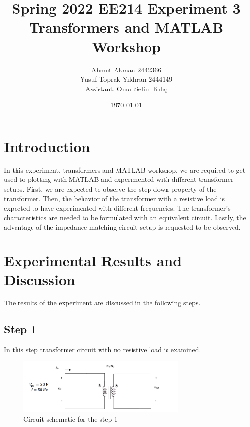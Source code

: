 \documentclass[letterpaper,12pt]{article}
\begin{document}
\thispagestyle{empty}

\title{Spring 2022 EE214 Experiment 3  \protect\\ Transformers and MATLAB Workshop }
\author{Ahmet Akman 2442366 \protect\\ Yusuf Toprak Yıldıran 2444149 \protect\\ Assistant: Onur Selim Kılıç}
\date{\today}
\maketitle
\tableofcontents
\section{Introduction}
In this experiment, transformers and MATLAB workshop, we are required to get used to plotting with MATLAB and experimented with different transformer setups. First, we are expected to observe the step-down property of the transformer. Then, the behavior of the transformer with a resistive load is expected to have experimented with different frequencies. The transformer's characteristics are needed to be formulated with an equivalent circuit. Lastly, the advantage of the impedance matching circuit setup is requested to be observed.
\section{Experimental Results and Discussion}
The results of the experiment are discussed in the following steps.
%
\subsection{Step 1}

In this step transformer circuit with no resistive load is examined.
\begin{figure}[H]
    \centering
    \includegraphics[width = 0.75\textwidth]{1.png}
    \caption{Circuit schematic for the step 1}
\end{figure} 
\end{document}
